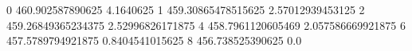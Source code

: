 0 460.902587890625 4.1640625
1 459.30865478515625 2.57012939453125
2 459.26849365234375 2.52996826171875
4 458.7961120605469 2.057586669921875
6 457.5789794921875 0.8404541015625
8 456.738525390625 0.0
